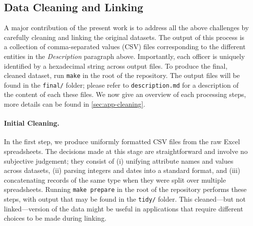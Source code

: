 \subsection{Data Cleaning and Linking}\label{sec:cleaning}

A major contribution of the present work is to address all the above challenges
by carefully cleaning and linking the original datasets. The output of this
process is a collection of comma-separated values (CSV) files corresponding to
the different entities in the \emph{Description} paragraph above.  Importantly,
each officer is uniquely identified by a hexadecimal string across output
files. To produce the final, cleaned dataset, run \texttt{make} in the root of
the repository. The output files will be found in the \texttt{final/} folder;
please refer to \texttt{description.md} for a description of the content of
each these files. We now give an overview of each processing steps, more
details can be found in \cref{sec:app-cleaning}.

\paragraph{Initial Cleaning.} In the first step, we produce uniformly formatted
CSV files from the raw Excel spreadsheets. The decisions made at this stage are
straightforward and involve no subjective judgement; they consist of (i)
unifying attribute names and values across datasets, (ii) parsing integers and
dates into a standard format, and (iii) concatenating records of the same type
when they were split over multiple spreadsheets.
Running \texttt{make prepare} in the root of the repository
performs these steps, with output that may be found in the
\texttt{tidy/} folder. This cleaned---but not linked---version of the data might be useful
in applications that require different choices to be made during linking.

